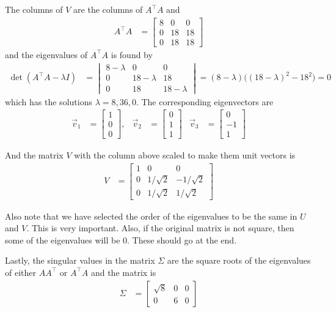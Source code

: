 \begin{example}
The columns of $V$ are the columns of $A^{\intercal}A$ and 
\begin{align*}
A^{\intercal}A & = \begin{bmatrix}
8 & 0 & 0 \\ 
0 & 18 & 18 \\
0 & 18 & 18 
\end{bmatrix}
\end{align*}
and the eigenvalues of $A^{\intercal}A$ is found by 
\begin{align*}
\det(A^{\intercal}A-\lambda I) & = \begin{vmatrix}
8-\lambda & 0 & 0 \\ 
0 & 18-\lambda & 18 \\
0 & 18 & 18-\lambda 
\end{vmatrix} = (8-\lambda)\bigl((18-\lambda)^2-18^2\bigr) = 0
\end{align*}
which has the solutions $\lambda=8,36,0$.  The corresponding eigenvectors are 
\begin{align*}
\vec{v}_1 & = \begin{bmatrix}
1 \\ 0 \\ 0
\end{bmatrix}, & \vec{v}_2 & = \begin{bmatrix}
0 \\ 1 \\1
\end{bmatrix} & \vec{v}_3 & = \begin{bmatrix}
0 \\ -1 \\ 1 
\end{bmatrix}
\end{align*}

And the matrix $V$ with the column above scaled to make them unit vectors is
\begin{align*}
V & = \begin{bmatrix}
1 & 0 & 0 \\
0 & 1/\sqrt{2} & -1/\sqrt{2} \\
0 & 1/\sqrt{2} & 1/\sqrt{2}
\end{bmatrix}
\end{align*}

Also note that we have selected the order of the eigenvalues to be the same in $U$ and $V$.  This is very important.  Also, if the original matrix is not square, then some of the eigenvalues will be 0.  These should go at the end.  

Lastly, the singular values in the matrix $\Sigma$ are the square roots of the eigenvalues of either $AA^{\intercal}$ or $A^{\intercal}A$ and the matrix is
\begin{align*}
\Sigma & = \begin{bmatrix}
\sqrt{8} & 0 & 0 \\
0 & 6 & 0  
\end{bmatrix}
\end{align*}

\end{example}

